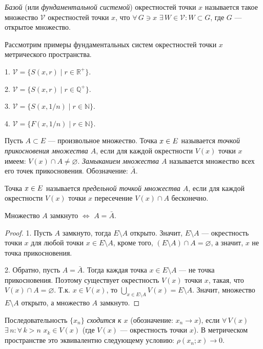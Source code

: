 \documentclass[12pt,titlepage, a4paper]{article}
\begin{document}
\begin{defen}
\emph{Базой} (или \emph{фундаментальной системой}) окрестностей
точки $x$ называется такое множество $\mathcal{V}$ окрестностей
точки $x$, что $\forall\,G\ni x$ $\exists\,W\in\mathcal{V}:W\subset
G$, где $G$ --- открытое множество.
\end{defen}

Рассмотрим примеры фундаментальных систем окрестностей точки $x$
метрического пространства.

\prim

1. $\mathcal{V}=\{S(x,r)\mid r\in\mathbb{R}^+\}$.

2. $\mathcal{V}=\{S(x,r)\mid r\in\mathbb{Q}^+\}$.

3. $\mathcal{V}=\{S(x,1/n)\mid r\in\mathbb{N}\}$.

4. $\mathcal{V}=\{F(x,1/n)\mid r\in\mathbb{N}\}$.

\begin{defen}
Пусть $A\subset E$ --- произвольное множество. Точка $x\p\in E$
называется \emph{точкой прикосновения множества $A$}, если для
каждой окрестности $V(x)$ точки $x$ имеем: $V(x)\cap
A\neq\varnothing$. \emph{Замыканием множества $A$} называется
множество всех его точек прикосновения. Обозначение: $\bar{A}$.

Точка $x\p\in E$ называется \emph{предельной точкой множества $A$},
если для каждой окрестности $V(x)$ точки $x$ пересечение $V(x)\cap
A$ бесконечно.
\end{defen}

\begin{predl}
Множество $A$ замкнуто $\Leftrightarrow$ $A=\bar{A}$.
\end{predl}

\begin{proof}
1. Пусть $A$ замкнуто, тогда $E\setminus A$ открыто. Значит,
$E\setminus A$
--- окрестность точки $x$ для любой точки $x\in E\setminus A$,
кроме того, $(E\setminus A)\cap A=\varnothing$, а значит, $x$ не
точка прикосновения.

2. Обратно, пусть $A=\bar{A}$. Тогда каждая точка $x\in E\setminus
A$ --- не точка прикосновения. Поэтому существует окрестность $V(x)$
точки $x$, такая, что $V(x)\cap A=\varnothing$. Т.к. $x\in V(x)$, то
$\bigcup\limits_{x\in E\setminus A}V(x)=E\setminus A$. Значит,
множество $E\setminus A$ открыто, а множество $A$ замкнуто.
\end{proof}

\begin{defen}
Последовательность $\{x_n\}$ \emph{сходится к $x$} (обозначение:
$x_n\to x$), если $\forall\, V(x)$ $\exists\,n:\forall\,k>n$ $x_k\in
V(x)$ (где $V(x)$ --- окрестность точки $x$). В метрическом
пространстве это эквивалентно следующему условию: $\rho(x_n;x)\to
0$.
\end{defen}
\end{document}
